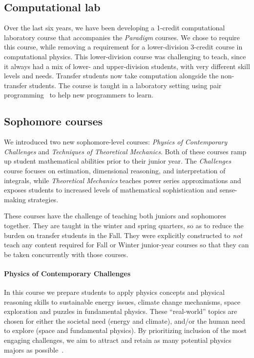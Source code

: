 \documentclass[english,aps,pra,reprint,noshowpacs,superscriptaddress]{revtex4-1}
\begin{document}
\subsection{Computational lab}
Over the last six years, we have been developing a 1-credit
computational laboratory course that accompanies the \emph{Paradigm} courses.  We
chose to require this course, while removing a requirement for a
lower-division 3-credit course in computational physics.  This
lower-division course was challenging to teach, since it always had a
mix of lower- and upper-division students, with very different skill
levels and needs.  Transfer students now take computation alongside
the non-transfer students. The course is taught in a laboratory setting using pair
programming~\cite{mcdowell2006pair} to help new programmers to learn.

\subsection{Sophomore courses}
We introduced two new sophomore-level courses: \emph{Physics of
Contemporary Challenges} and \emph{Techniques of Theoretical Mechanics}.  Both of
these courses ramp up student mathematical abilities prior to their
junior year.  The \emph{Challenges} course focuses on estimation,
dimensional reasoning, and interpretation of integrals, while
\emph{Theoretical Mechanics} teaches power series approximations and
exposes students to increased levels of mathematical sophistication and
sense-making strategies.

These courses have the challenge of teaching both juniors and sophomores
together.  They are taught in the winter and spring quarters, so
as to reduce the burden on transfer students in the Fall.  They were
explicitly constructed to \emph{not} teach any content required for
Fall or Winter junior-year courses so that they can be taken concurrently with
those courses.

\paragraph{Physics of Contemporary Challenges}
In this course we prepare students to
apply physics concepts and physical reasoning skills to sustainable
energy issues, climate change mechanisms, space exploration and
puzzles in fundamental physics. These ``real-world'' topics are chosen
for either the societal need (energy and climate), and/or the human
need to explore (space and fundamental physics). By prioritizing
inclusion of the most engaging challenges, we aim to attract and
retain as many potential physics majors as 
possible~\cite{kramer2016gathering}.
\end{document}
